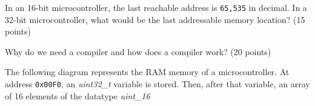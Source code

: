 \documentclass[11pt,letterpaper]{exam}
\begin{document}
\begin{questions}
        \question In an 16-bit microcontroller, the last reachable address is \texttt{65,535} in decimal. In a 32-bit microcontroller, what would be the last addressable memory location? (15 points)
        
        \clearpage
        \question Why do we need a compiler and how does a compiler work? (20 points)

        \question The following diagram represents the RAM memory of a microcontroller. At address \texttt{0x00F0}, an \textit{uint32_t} variable is stored. Then, after that variable, an array of 16 elements of the datatype \textit{uint_16}
        
    \end{questions}
\end{document}
